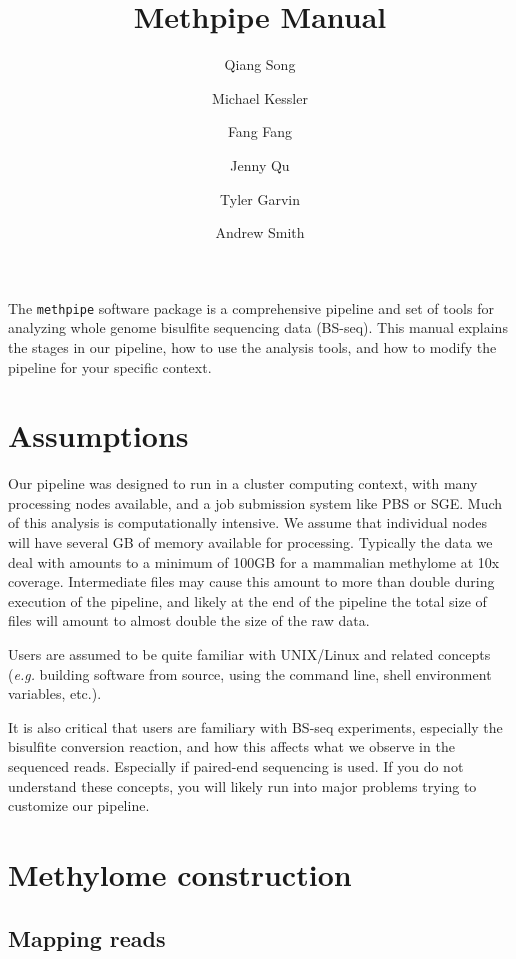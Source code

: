 \documentclass[10pt]{article}
\title{Methpipe Manual}
\author{Qiang Song \and Michael Kessler \and Fang Fang \and Jenny Qu \and
Tyler Garvin \and Andrew Smith}
\newcommand{\meth}{\texttt{methpipe}}
\begin{document}
\maketitle

The \meth{} software package is a comprehensive pipeline and set of
tools for analyzing whole genome bisulfite sequencing data
(BS-seq). This manual explains the stages in our pipeline, how to use
the analysis tools, and how to modify the pipeline for your specific
context.

\section{Assumptions}

Our pipeline was designed to run in a cluster computing context, with
many processing nodes available, and a job submission system like PBS
or SGE. Much of this analysis is computationally intensive. We assume
that individual nodes will have several GB of memory available for
processing. Typically the data we deal with amounts to a minimum of
100GB for a mammalian methylome at 10x coverage. Intermediate files
may cause this amount to more than double during execution of the
pipeline, and likely at the end of the pipeline the total size of
files will amount to almost double the size of the raw data.

Users are assumed to be quite familiar with UNIX/Linux and related
concepts ({\em e.g.} building software from source, using the command
line, shell environment variables, etc.).

It is also critical that users are familiary with BS-seq experiments,
especially the bisulfite conversion reaction, and how this affects
what we observe in the sequenced reads. Especially if paired-end
sequencing is used. If you do not understand these concepts, you will
likely run into major problems trying to customize our pipeline.

\section{Methylome construction}

\subsection{Mapping reads}
\label{sec:mapping}

\end{document}
